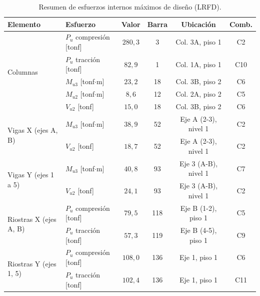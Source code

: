\documentclass[11pt,letterpaper]{article}
\begin{document}
\begin{table}[H]
\centering
\small
\caption{Resumen de esfuerzos internos máximos de diseño (LRFD).}
\label{tab:esf}
\begin{tabular}{llcccc}
\toprule
Elemento & Esfuerzo & Valor & Barra & Ubicación & Comb. \\
\midrule
\multirow{5}{*}{Columnas} & $P_u$ compresión [tonf] & $280{,}3$ & 3 & Col. 3A, piso 1 & C2 \\
 & $P_u$ tracción [tonf] & $82{,}9$ & 1 & Col. 1A, piso 1 & C10 \\
 & $M_{u3}$ [tonf$\cdot$m] & $23{,}2$ & 18 & Col. 3B, piso 2 & C6 \\
 & $M_{u2}$ [tonf$\cdot$m] & $8{,}6$ & 12 & Col. 2A, piso 2 & C5 \\
 & $V_{u2}$ [tonf] & $15{,}0$ & 18 & Col. 3B, piso 2 & C6 \\
\midrule
\multirow{2}{*}{Vigas X (ejes A, B)} & $M_{u3}$ [tonf$\cdot$m] & $38{,}9$ & 52 & Eje A (2-3), nivel 1 & C2 \\
 & $V_{u2}$ [tonf] & $18{,}7$ & 52 & Eje A (2-3), nivel 1 & C2 \\
\midrule
\multirow{2}{*}{Vigas Y (ejes 1 a 5)} & $M_{u3}$ [tonf$\cdot$m] & $40{,}8$ & 93 & Eje 3 (A-B), nivel 1 & C7 \\
 & $V_{u2}$ [tonf] & $24{,}1$ & 93 & Eje 3 (A-B), nivel 1 & C2 \\
\midrule
\multirow{2}{*}{Riostras X (ejes A, B)} & $P_u$ compresión [tonf] & $79{,}5$ & 118 & Eje B (1-2), piso 1 & C5 \\
 & $P_u$ tracción [tonf] & $57{,}3$ & 119 & Eje B (4-5), piso 1 & C9 \\
\midrule
\multirow{2}{*}{Riostras Y (ejes 1, 5)} & $P_u$ compresión [tonf] & $108{,}0$ & 136 & Eje 1, piso 1 & C6 \\
 & $P_u$ tracción [tonf] & $102{,}4$ & 136 & Eje 1, piso 1 & C11 \\
\bottomrule
\end{tabular}
\end{table}
\end{document}
